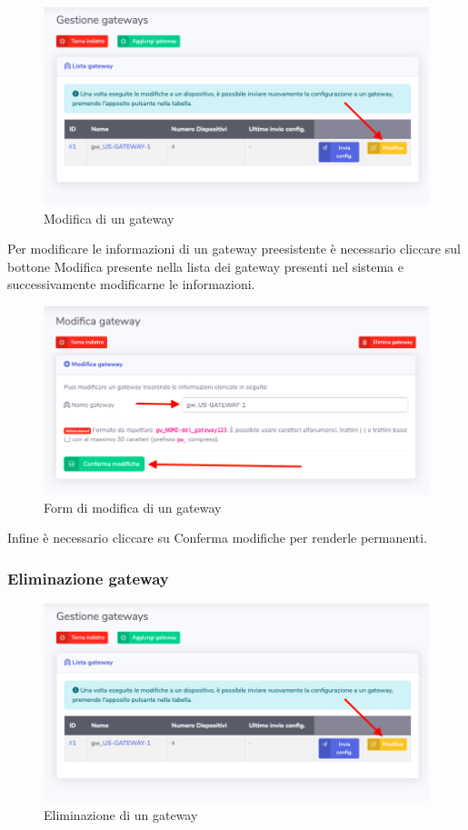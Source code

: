 		\begin{figure}[H]
		\centering
		\includegraphics[scale=0.600]{res/images/admin/selModGateway.png}
		\caption{Modifica di un gateway}
	\end{figure}

		Per modificare le informazioni di un gateway preesistente è necessario cliccare sul bottone Modifica presente nella lista dei gateway presenti nel sistema e successivamente modificarne le informazioni.

		\begin{figure}[H]
		\centering
		\includegraphics[scale=0.600]{res/images/admin/modGateway.png}
		\caption{Form di modifica di un gateway}
	\end{figure}

		Infine è necessario cliccare su Conferma modifiche per renderle permanenti.

	\subsubsection{Eliminazione gateway}

		\begin{figure}[H]
		\centering
		\includegraphics[scale=0.600]{res/images/admin/selModGateway.png}
		\caption{Eliminazione di un gateway}
	\end{figure}

